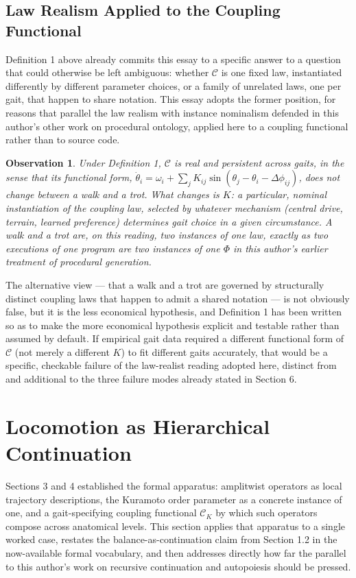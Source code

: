 \documentclass[12pt]{article}
\newtheorem{observation}{Observation}
\begin{document}
\subsection{Law Realism Applied to the Coupling Functional}

Definition 1 above already commits this essay to a specific answer to a question that could otherwise be left ambiguous: whether $\mathcal{C}$ is one fixed law, instantiated differently by different parameter choices, or a family of unrelated laws, one per gait, that happen to share notation. This essay adopts the former position, for reasons that parallel the law realism with instance nominalism defended in this author's other work on procedural ontology, applied here to a coupling functional rather than to source code.

\begin{observation}
Under Definition 1, $\mathcal{C}$ is real and persistent across gaits, in the sense that its functional form, $\dot\theta_i = \omega_i + \sum_j K_{ij}\sin(\theta_j - \theta_i - \Delta\phi_{ij})$, does not change between a walk and a trot. What changes is $K$: a particular, nominal instantiation of the coupling law, selected by whatever mechanism (central drive, terrain, learned preference) determines gait choice in a given circumstance. A walk and a trot are, on this reading, two instances of one law, exactly as two executions of one program are two instances of one $\Phi$ in this author's earlier treatment of procedural generation.
\end{observation}

The alternative view — that a walk and a trot are governed by structurally distinct coupling laws that happen to admit a shared notation — is not obviously false, but it is the less economical hypothesis, and Definition 1 has been written so as to make the more economical hypothesis explicit and testable rather than assumed by default. If empirical gait data required a different functional form of $\mathcal{C}$ (not merely a different $K$) to fit different gaits accurately, that would be a specific, checkable failure of the law-realist reading adopted here, distinct from and additional to the three failure modes already stated in Section 6.

\section{Locomotion as Hierarchical Continuation}

Sections 3 and 4 established the formal apparatus: amplitwist operators as local trajectory descriptions, the Kuramoto order parameter as a concrete instance of one, and a gait-specifying coupling functional $\mathcal{C}_K$ by which such operators compose across anatomical levels. This section applies that apparatus to a single worked case, restates the balance-as-continuation claim from Section 1.2 in the now-available formal vocabulary, and then addresses directly how far the parallel to this author's work on recursive continuation and autopoiesis should be pressed.
\end{document}
